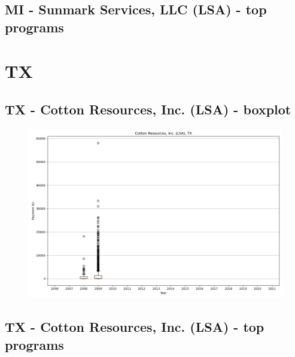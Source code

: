 \subsection*{MI - Sunmark Services, LLC (LSA) - top programs}

\newpage
\section*{TX}
\subsection*{TX - Cotton Resources, Inc. (LSA) - boxplot}
\begin{figure}[h]
\centering
\includegraphics[width=7in]{../output/boxplots/counties/Cotton Resources, Inc. (LSA)-TX_boxplot.png}
\end{figure}


\subsection*{TX - Cotton Resources, Inc. (LSA) - top programs}

\newpage

